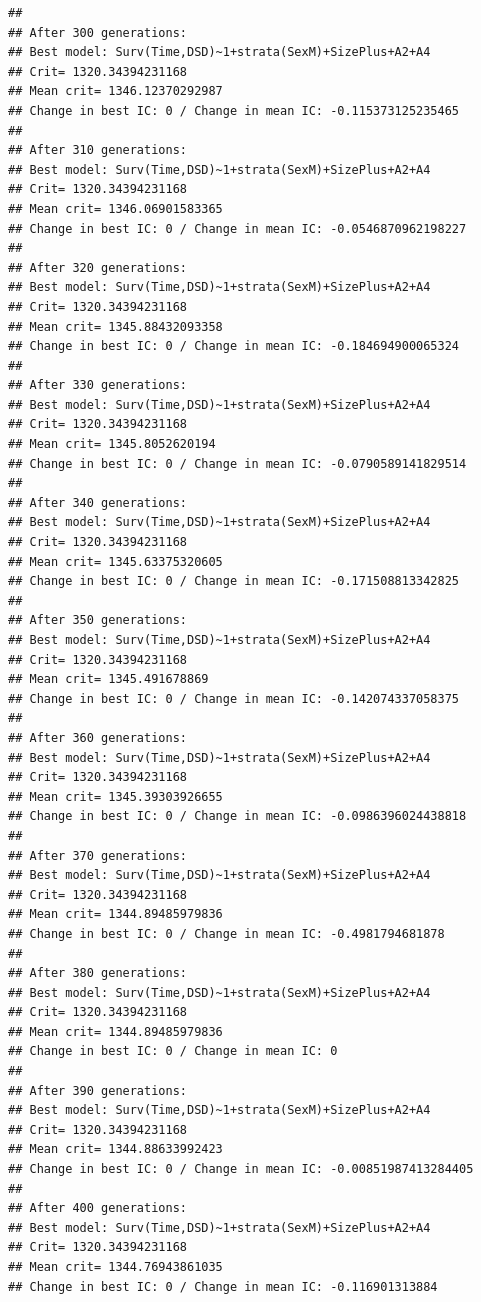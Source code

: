 \documentclass{article}\usepackage[]{graphicx}\usepackage[]{color}
\makeatletter
\newenvironment{kframe}{%
 \def\at@end@of@kframe{}%
 \ifinner\ifhmode%
  \def\at@end@of@kframe{\end{minipage}}%
  \begin{minipage}{\columnwidth}%
 \fi\fi%
 \def\FrameCommand##1{\hskip\@totalleftmargin \hskip-\fboxsep
 \colorbox{shadecolor}{##1}\hskip-\fboxsep
     \hskip-\linewidth \hskip-\@totalleftmargin \hskip\columnwidth}%
 \MakeFramed {\advance\hsize-\width
   \@totalleftmargin\z@ \linewidth\hsize
   \@setminipage}}%
 {\par\unskip\endMakeFramed%
 \at@end@of@kframe}
\newenvironment{knitrout}{}{} %
\makeatother
\begin{document}
\begin{knitrout}
\begin{kframe}
{\ttfamily\noindent\color{warningcolor}{\#\# Warning in fitter(X, Y, strats, offset, init, control, weights = weights, : Loglik converged before variable\ \ 13 ; beta may be infinite.}}\begin{verbatim}
## 
## After 300 generations:
## Best model: Surv(Time,DSD)~1+strata(SexM)+SizePlus+A2+A4
## Crit= 1320.34394231168
## Mean crit= 1346.12370292987
## Change in best IC: 0 / Change in mean IC: -0.115373125235465
## 
## After 310 generations:
## Best model: Surv(Time,DSD)~1+strata(SexM)+SizePlus+A2+A4
## Crit= 1320.34394231168
## Mean crit= 1346.06901583365
## Change in best IC: 0 / Change in mean IC: -0.0546870962198227
## 
## After 320 generations:
## Best model: Surv(Time,DSD)~1+strata(SexM)+SizePlus+A2+A4
## Crit= 1320.34394231168
## Mean crit= 1345.88432093358
## Change in best IC: 0 / Change in mean IC: -0.184694900065324
## 
## After 330 generations:
## Best model: Surv(Time,DSD)~1+strata(SexM)+SizePlus+A2+A4
## Crit= 1320.34394231168
## Mean crit= 1345.8052620194
## Change in best IC: 0 / Change in mean IC: -0.0790589141829514
## 
## After 340 generations:
## Best model: Surv(Time,DSD)~1+strata(SexM)+SizePlus+A2+A4
## Crit= 1320.34394231168
## Mean crit= 1345.63375320605
## Change in best IC: 0 / Change in mean IC: -0.171508813342825
## 
## After 350 generations:
## Best model: Surv(Time,DSD)~1+strata(SexM)+SizePlus+A2+A4
## Crit= 1320.34394231168
## Mean crit= 1345.491678869
## Change in best IC: 0 / Change in mean IC: -0.142074337058375
## 
## After 360 generations:
## Best model: Surv(Time,DSD)~1+strata(SexM)+SizePlus+A2+A4
## Crit= 1320.34394231168
## Mean crit= 1345.39303926655
## Change in best IC: 0 / Change in mean IC: -0.0986396024438818
## 
## After 370 generations:
## Best model: Surv(Time,DSD)~1+strata(SexM)+SizePlus+A2+A4
## Crit= 1320.34394231168
## Mean crit= 1344.89485979836
## Change in best IC: 0 / Change in mean IC: -0.4981794681878
## 
## After 380 generations:
## Best model: Surv(Time,DSD)~1+strata(SexM)+SizePlus+A2+A4
## Crit= 1320.34394231168
## Mean crit= 1344.89485979836
## Change in best IC: 0 / Change in mean IC: 0
## 
## After 390 generations:
## Best model: Surv(Time,DSD)~1+strata(SexM)+SizePlus+A2+A4
## Crit= 1320.34394231168
## Mean crit= 1344.88633992423
## Change in best IC: 0 / Change in mean IC: -0.00851987413284405
## 
## After 400 generations:
## Best model: Surv(Time,DSD)~1+strata(SexM)+SizePlus+A2+A4
## Crit= 1320.34394231168
## Mean crit= 1344.76943861035
## Change in best IC: 0 / Change in mean IC: -0.116901313884
\end{verbatim}



\end{kframe}
\end{knitrout}
\end{document}
